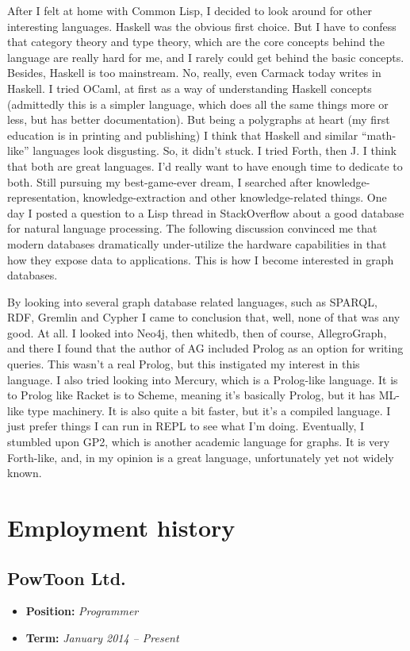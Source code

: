 \documentclass[oneside]{memoir}
\begin{document}
After I felt at home with Common Lisp, I decided to look around for other
interesting languages.  Haskell was the obvious first choice.  But I have to
confess that category theory and type theory, which are the core concepts
behind the language are really hard for me, and I rarely could get behind the
basic concepts.  Besides, Haskell is too mainstream.  No, really, even Carmack
today writes in Haskell.  I tried OCaml, at first as a way of understanding
Haskell concepts (admittedly this is a simpler language, which does all the
same things more or less, but has better documentation).  But being a
polygraphs at heart (my first education is in printing and publishing) I think
that Haskell and similar ``math-like'' languages look disgusting.  So, it
didn't stuck.  I tried Forth, then J.  I think that both are great languages.
I'd really want to have enough time to dedicate to both.  Still pursuing my
best-game-ever dream, I searched after knowledge-representation,
knowledge-extraction and other knowledge-related things.  One day I posted a
question to a Lisp thread in StackOverflow about a good database for natural
language processing.  The following discussion convinced me that modern
databases dramatically under-utilize the hardware capabilities in that how
they expose data to applications.  This is how I become interested in graph
databases.

By looking into several graph database related languages, such as SPARQL, RDF,
Gremlin and Cypher I came to conclusion that, well, none of that was any good.
At all.  I looked into Neo4j, then whitedb, then of course, AllegroGraph, and
there I found that the author of AG included Prolog as an option for writing
queries.  This wasn't a real Prolog, but this instigated my interest in this
language.  I also tried looking into Mercury, which is a Prolog-like language.
It is to Prolog like Racket is to Scheme, meaning it's basically Prolog, but
it has ML-like type machinery. It is also quite a bit faster, but it's a
compiled language.  I just prefer things I can run in REPL to see what I'm
doing.  Eventually, I stumbled upon GP2, which is another academic language
for graphs.  It is very Forth-like, and, in my opinion is a great language,
unfortunately yet not widely known.

\mainmatter
\chapter{Employment history}
\label{sec-3}

\section{PowToon Ltd.}
\label{sec-3-1}
\begin{itemize}
\item \textbf{Position:} \emph{Programmer}
\item \textbf{Term:} \emph{January 2014 – Present}
\end{itemize}
\end{document}
